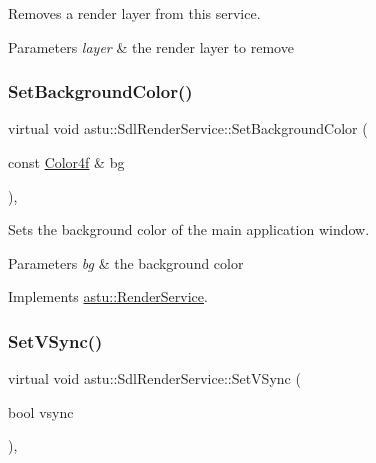 Removes a render layer from this service.


\begin{DoxyParams}{Parameters}
{\em layer} & the render layer to remove \\
\hline
\end{DoxyParams}
\mbox{\label{classastu_1_1SdlRenderService_a1b92671271fa91f44e7b3e6c57bebe54}} 
\subsubsection{\texorpdfstring{Set\+Background\+Color()}{SetBackgroundColor()}}
{\footnotesize\ttfamily virtual void astu\+::\+Sdl\+Render\+Service\+::\+Set\+Background\+Color (\begin{DoxyParamCaption}\item[{const \hyperlink{classastu_1_1Color}{Color4f} \&}]{bg }\end{DoxyParamCaption})\hspace{0.3cm}{\ttfamily [override]}, {\ttfamily [virtual]}}

Sets the background color of the main application window.


\begin{DoxyParams}{Parameters}
{\em bg} & the background color \\
\hline
\end{DoxyParams}


Implements \hyperlink{classastu_1_1RenderService_acae1a271e76761320a95d5664ce5b134}{astu\+::\+Render\+Service}.

\mbox{\label{classastu_1_1SdlRenderService_a4887120e1595f4b257e4813e09121e89}} 
\subsubsection{\texorpdfstring{Set\+V\+Sync()}{SetVSync()}}
{\footnotesize\ttfamily virtual void astu\+::\+Sdl\+Render\+Service\+::\+Set\+V\+Sync (\begin{DoxyParamCaption}\item[{bool}]{vsync }\end{DoxyParamCaption})\hspace{0.3cm}{\ttfamily [override]}, {\ttfamily [virtual]}}

